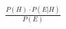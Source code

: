 \documentclass[preview]{standalone}
\begin{document}
\begin{align*}
\frac{P(H) \cdot P(E|H)}{P(E)}
\end{align*}
\end{document}
